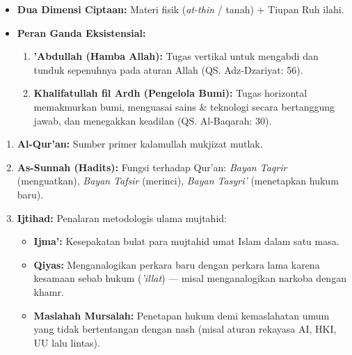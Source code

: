 \documentclass[10pt,a4paper]{article}
\begin{document}
\begin{conceptbox}
\begin{itemize}
  \item \textbf{Dua Dimensi Ciptaan:} Materi fisik (\textit{at-thin} / tanah) + Tiupan Ruh ilahi.
  \item \textbf{Peran Ganda Eksistensial:}
    \begin{enumerate}
      \item \textbf{'Abdullah (Hamba Allah):} Tugas vertikal untuk mengabdi dan tunduk sepenuhnya pada aturan Allah (QS. Adz-Dzariyat: 56).
      \item \textbf{Khalifatullah fil Ardh (Pengelola Bumi):} Tugas horizontal memakmurkan bumi, menguasai sains \& teknologi secara bertanggung jawab, dan menegakkan keadilan (QS. Al-Baqarah: 30).
    \end{enumerate}
\end{itemize}
\end{conceptbox}

\begin{conceptbox}
\begin{enumerate}
  \item \textbf{Al-Qur'an:} Sumber primer kalamullah mukjizat mutlak.
  \item \textbf{As-Sunnah (Hadits):} Fungsi terhadap Qur'an: \textit{Bayan Taqrir} (menguatkan), \textit{Bayan Tafsir} (merinci), \textit{Bayan Tasyri'} (menetapkan hukum baru).
  \item \textbf{Ijtihad:} Penalaran metodologis ulama mujtahid:
    \begin{itemize}
      \item \textbf{Ijma':} Kesepakatan bulat para mujtahid umat Islam dalam satu masa.
      \item \textbf{Qiyas:} Menganalogikan perkara baru dengan perkara lama karena kesamaan sebab hukum (\textit{'illat}) --- misal menganalogikan narkoba dengan khamr.
      \item \textbf{Maslahah Mursalah:} Penetapan hukum demi kemaslahatan umum yang tidak bertentangan dengan nash (misal aturan rekayasa AI, HKI, UU lalu lintas).
    \end{itemize}
\end{enumerate}
\end{conceptbox}
\end{document}
